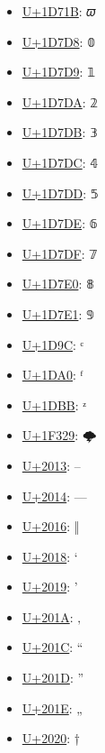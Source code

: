 \begin{itemize}
	\item \href{https://www.compart.com/en/unicode/U+1D71B}{U+1D71B}: 𝜛
	\item \href{https://www.compart.com/en/unicode/U+1D7D8}{U+1D7D8}: 𝟘
	\item \href{https://www.compart.com/en/unicode/U+1D7D9}{U+1D7D9}: 𝟙
	\item \href{https://www.compart.com/en/unicode/U+1D7DA}{U+1D7DA}: 𝟚
	\item \href{https://www.compart.com/en/unicode/U+1D7DB}{U+1D7DB}: 𝟛
	\item \href{https://www.compart.com/en/unicode/U+1D7DC}{U+1D7DC}: 𝟜
	\item \href{https://www.compart.com/en/unicode/U+1D7DD}{U+1D7DD}: 𝟝
	\item \href{https://www.compart.com/en/unicode/U+1D7DE}{U+1D7DE}: 𝟞
	\item \href{https://www.compart.com/en/unicode/U+1D7DF}{U+1D7DF}: 𝟟
	\item \href{https://www.compart.com/en/unicode/U+1D7E0}{U+1D7E0}: 𝟠
	\item \href{https://www.compart.com/en/unicode/U+1D7E1}{U+1D7E1}: 𝟡
	\item \href{https://www.compart.com/en/unicode/U+1D9C}{U+1D9C}: ᶜ
	\item \href{https://www.compart.com/en/unicode/U+1DA0}{U+1DA0}: ᶠ
	\item \href{https://www.compart.com/en/unicode/U+1DBB}{U+1DBB}: ᶻ
	\item \href{https://www.compart.com/en/unicode/U+1F329}{U+1F329}: 🌩
	\item \href{https://www.compart.com/en/unicode/U+2013}{U+2013}: –
	\item \href{https://www.compart.com/en/unicode/U+2014}{U+2014}: —
	\item \href{https://www.compart.com/en/unicode/U+2016}{U+2016}: ‖
	\item \href{https://www.compart.com/en/unicode/U+2018}{U+2018}: ‘
	\item \href{https://www.compart.com/en/unicode/U+2019}{U+2019}: ’
	\item \href{https://www.compart.com/en/unicode/U+201A}{U+201A}: ‚
	\item \href{https://www.compart.com/en/unicode/U+201C}{U+201C}: “
	\item \href{https://www.compart.com/en/unicode/U+201D}{U+201D}: ”
	\item \href{https://www.compart.com/en/unicode/U+201E}{U+201E}: „
	\item \href{https://www.compart.com/en/unicode/U+2020}{U+2020}: †

\end{itemize}
